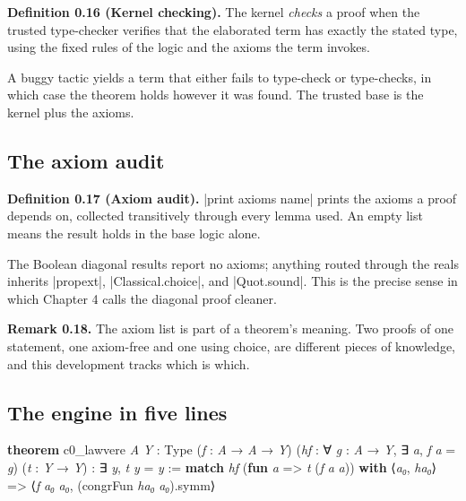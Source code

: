 \documentclass{memoir}
\begin{document}
\textbf{Definition 0.16 (Kernel checking).} The kernel \emph{checks} a proof when the trusted
type-checker verifies that the elaborated term has exactly the stated type,
using the fixed rules of the logic and the axioms the term invokes.

A buggy tactic yields a term that either fails to type-check or type-checks, in
which case the theorem holds however it was found. The trusted base is the
kernel plus the axioms.



\subsection{The axiom audit}\label{Two--Schemas--of--Impossibility-005F-005F-005F--Machine--Checked--Limits--of--Trustworthy--Machine--Learning-005F-005F-005F--and--Why--They--Tighten--with--Capability----Preliminaries----How--to--read--the--Lean--4----The--axiom--audit}

\textbf{Definition 0.17 (Axiom audit).} \LeanVerb|print axioms name| prints the axioms a proof
depends on, collected transitively through every lemma used. An empty list means
the result holds in the base logic alone.

The Boolean diagonal results report no axioms; anything routed through the reals
inherits \LeanVerb|propext|, \LeanVerb|Classical.choice|, and \LeanVerb|Quot.sound|. This is the precise
sense in which Chapter 4 calls the diagonal proof cleaner.

\textbf{Remark 0.18.} The axiom list is part of a theorem's meaning. Two proofs of one
statement, one axiom-free and one using choice, are different pieces of
knowledge, and this development tracks which is which.



\subsection{The engine in five lines}\label{Two--Schemas--of--Impossibility-005F-005F-005F--Machine--Checked--Limits--of--Trustworthy--Machine--Learning-005F-005F-005F--and--Why--They--Tighten--with--Capability----Preliminaries----How--to--read--the--Lean--4----The--engine--in--five--lines}

\begin{LeanVerbatim}
\textbf{theorem} c0_lawvere \textit{A} \textit{Y} : Type (\textit{f} : \textit{A} → \textit{A} → \textit{Y})
    (\textit{hf} : ∀ \textit{g} : \textit{A} → \textit{Y}, ∃ \textit{a}, \textit{f} \textit{a} = \textit{g})
    (\textit{t} : \textit{Y} → \textit{Y}) : ∃ \textit{y}, \textit{t} \textit{y} = \textit{y} :=
  \textbf{match} \textit{hf} (\textbf{fun} \textit{a} => \textit{t} (\textit{f} \textit{a} \textit{a})) \textbf{with}
   ⟨\textit{a₀}, \textit{ha₀}⟩ => ⟨\textit{f} \textit{a₀} \textit{a₀}, (congrFun \textit{ha₀} \textit{a₀}).symm⟩

\end{LeanVerbatim}
\end{document}
